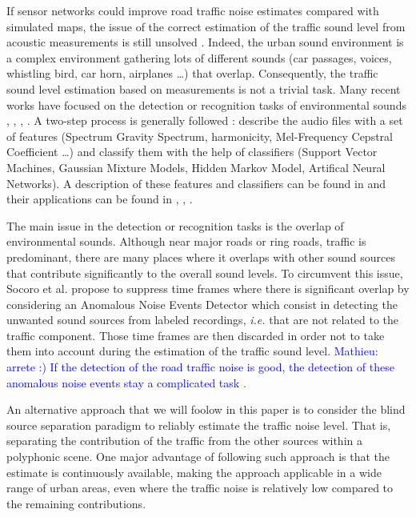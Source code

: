 \documentclass[twocolumn,a4paper,10pt]{article}
\newcommand{\ml}[1]{\textcolor{blue}{ Mathieu: #1}}
\begin{document}
If sensor networks could improve road traffic noise estimates compared with simulated maps, the issue of the correct estimation of the traffic sound level from acoustic measurements is still unsolved \cite{Mioduszewski}. Indeed, the urban sound environment is a complex environment gathering lots of different sounds (car passages, voices, whistling bird, car horn, airplanes \dots) that overlap. Consequently, the traffic sound level estimation based on measurements is not a trivial task.
Many recent works have focused on the detection or recognition tasks of environmental sounds \cite{heittola_sound_2011}, \cite{defreville_automatic_2006}, \cite{dufaux_automatic_2000}, \cite{chu_environmental_2009}. A two-step process is generally followed : describe the audio files with a set of features (Spectrum Gravity Spectrum, harmonicity, Mel-Frequency Cepstral Coefficient \dots) and classify them with the help of classifiers (Support Vector Machines, Gaussian Mixture Models, Hidden Markov Model, Artifical Neural Networks). A description of these features and classifiers can be found in \cite{cowling_comparison_2003} and their applications can be found in \cite{shen_environmental_2012}, \cite{beritelli_pattern_2008}, \cite{couvreur_automatic_2004}.

The main issue in the detection or recognition tasks is the overlap of environmental sounds. Although near major roads or ring roads, traffic is predominant, there are many places where it overlaps with other sound sources that contribute significantly to the overall sound levels. To circumvent this issue, Socoro et al. propose to suppress time frames where there is significant overlap by considering an Anomalous Noise Events Detector \cite{socoro_anomalous_2017} which consist in detecting the unwanted sound sources from labeled recordings, \textit{i.e.} that are not related to the traffic component. Those time frames are then discarded in order not to take them into account during the estimation of the traffic sound level.  \ml{arrete :) If the detection of the road traffic noise is good, the detection of these anomalous noise events stay a complicated task \cite{stowell2015detection}.}

An alternative approach that we will foolow in this paper is to consider the blind source separation paradigm to reliably estimate the traffic noise level. That is, separating the contribution of the traffic from the other sources within a polyphonic scene. One major advantage of following such approach is that the estimate is continuously available, making the approach applicable in a wide range of urban areas, even where the traffic noise is relatively low compared to the remaining contributions.\\
\end{document}
